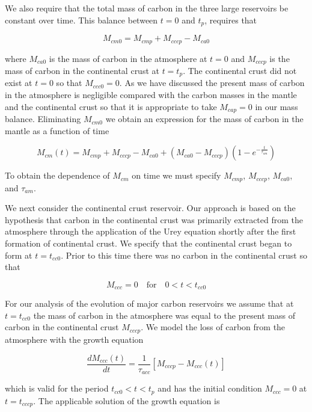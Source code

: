 {We also require that the total mass of carbon in the three large reservoirs be constant over time. This balance between $t=0$ and $t_p$, requires that

\begin{equation}
  M_{cm0} = M_{cmp} + M_{cccp} - M_{ca0}
\end{equation}

where $M_{ca0}$ is the mass of carbon in the atmosphere at $t=0$ and $M_{cccp}$ is the mass of carbon in the continental crust at $t=t_p$. The continental crust did not exist at $t=0$ so that $M_{ccc0}=0$. As we have discussed the present mass of carbon in the atmosphere is negligible compared with the carbon masses in the mantle and the continental crust so that it is appropriate to take $M_{cap}=0$ in our mass balance. Eliminating $M_{cm0}$ we obtain an expression for the mass of carbon in the mantle as a function of time

\begin{equation}
  M_{cm}(t) = M_{cmp} + M_{cccp} - M_{ca0} + (M_{ca0} - M_{cccp}) (1 - e^{-\frac{t}{\tau_{am}}})
\end{equation}

To obtain the dependence of $M_{cm}$ on time we must specify $M_{cmp}$, $M_{cccp}$, $M_{ca0}$, and $\tau_{am}$.


We next consider the continental crust reservoir. Our approach is based on the hypothesis that carbon in the continental crust was primarily extracted from the atmosphere through the application of the Urey equation shortly after the first formation of continental crust. We specify that the continental crust began to form at $t=t_{cc0}$. Prior to this time there was no carbon in the continental crust so that

\begin{equation}
  M_{ccc} = 0 \quad \text{for} \quad 0 < t < t_{cc0}
\end{equation}

For our analysis of the evolution of major carbon reservoirs we assume that at $t=t_{cc0}$ the mass of carbon in the atmosphere was equal to the present mass of carbon in the continental crust $M_{cccp}$. We model the loss of carbon from the atmosphere with the growth equation

\begin{equation}
    \frac{d M_{ccc}(t)}{d t} = \frac{1}{\tau_{acc}} [M_{cccp} - M_{ccc}(t)]
\end{equation}

which is valid for the period $t_{cc0} < t < t_p$ and has the initial condition $M_{ccc} = 0$ at $t = t_{cccp}$. The applicable solution of the growth equation is

}
